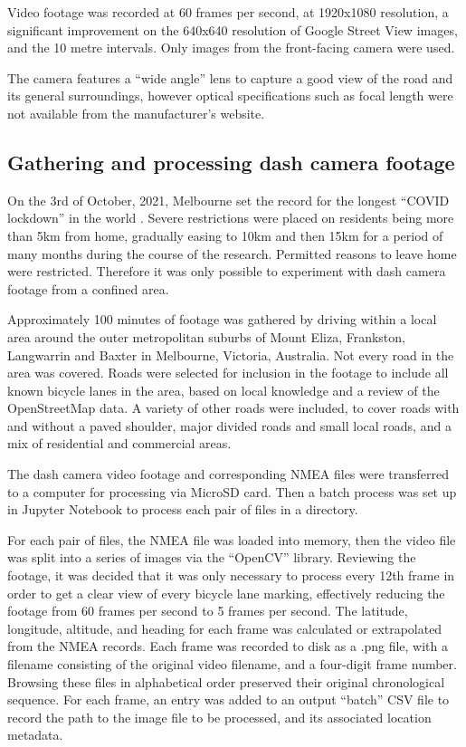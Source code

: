 \documentclass[11pt,twoside]{report}
\begin{document}
Video footage was recorded at 60 frames per second, at 1920x1080 resolution, a significant improvement on the 640x640 resolution of Google Street View images, and the 10 metre intervals.  Only images from the front-facing camera were used.

The camera features a ``wide angle'' lens to capture a good view of the road and its general surroundings, however optical specifications such as focal length were not available from the manufacturer's website.


\subsection{Gathering and processing dash camera footage}
\label{s:rq3b}

On the 3rd of October, 2021, Melbourne set the record for the longest ``COVID lockdown'' in the world \cite{lockdown_record}.  Severe restrictions were placed on residents being more than 5km from home, gradually easing to 10km and then 15km for a period of many months during the course of the research\cite{lockdown_5km}.  Permitted reasons to leave home were restricted.  Therefore it was only possible to experiment with dash camera footage from a confined area.

Approximately 100 minutes of footage was gathered by driving within a local area around the outer metropolitan suburbs of Mount Eliza, Frankston, Langwarrin and Baxter in Melbourne, Victoria, Australia.  Not every road in the area was covered.  Roads were selected for inclusion in the footage to include all known bicycle lanes in the area, based on local knowledge and a review of the OpenStreetMap data.  A variety of other roads were included, to cover roads with and without a paved shoulder, major divided roads and small local roads, and a mix of residential and commercial areas.

The dash camera video footage and corresponding NMEA files were transferred to a computer for processing via MicroSD card.  Then a batch process was set up in Jupyter Notebook to process each pair of files in a directory.

For each pair of files, the NMEA file was loaded into memory, then the video file was split into a series of images via the ``OpenCV'' library.  Reviewing the footage, it was decided that it was only necessary to process every 12th frame in order to get a clear view of every bicycle lane marking, effectively reducing the footage from 60 frames per second to 5 frames per second.  The latitude, longitude, altitude, and heading for each frame was calculated or extrapolated from the NMEA records.  Each frame was recorded to disk as a .png file, with a filename consisting of the original video filename, and a four-digit frame number.  Browsing these files in alphabetical order preserved their original chronological sequence.  For each frame, an entry was added to an output ``batch'' CSV file to record the path to the image file to be processed, and its associated location metadata.
\end{document}
